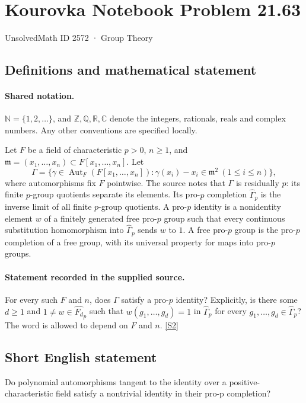 \documentclass[11pt]{article}
\newcommand{\sref}[2]{\hyperlink{source:#1:#2}{[S#2]}}
\begin{document}
\setcounter{section}{2571}
\section{Kourovka Notebook Problem 21.63}\label{2572}
{\small\sffamily UnsolvedMath ID 2572 · Group Theory}
\subsection{Definitions and mathematical statement}

\paragraph{Shared notation.}$\mathbb N=\{1,2,\ldots\}$, and $\mathbb Z,\mathbb Q,\mathbb R,\mathbb C$ denote the integers, rationals, reals and complex numbers. Any other conventions are specified locally.


Let $F$ be a field of characteristic $p>0$, $n\geq1$, and $\mathfrak m=(x_1,\ldots,x_n)\subset F[x_1,\ldots,x_n]$. Let
\[
 \Gamma=\{\gamma\in\operatorname{Aut}_F(F[x_1,\ldots,x_n]):\gamma(x_i)-x_i\in\mathfrak m^2\ (1\leq i\leq n)\},
\]
where automorphisms fix $F$ pointwise. The source notes that $\Gamma$ is residually $p$: its finite $p$-group quotients separate its elements. Its pro-$p$ completion $\widehat\Gamma_p$ is the inverse limit of all finite $p$-group quotients. A pro-$p$ identity is a nonidentity element $w$ of a finitely generated free pro-$p$ group such that every continuous substitution homomorphism into $\widehat\Gamma_p$ sends $w$ to $1$. A free pro-$p$ group is the pro-$p$ completion of a free group, with its universal property for maps into pro-$p$ groups.
\paragraph{Statement recorded in the supplied source.}
For every such $F$ and $n$, does $\Gamma$ satisfy a pro-$p$ identity? Explicitly, is there some $d\geq1$ and $1\ne w\in\widehat{F_d}_p$ such that $w(g_1,\ldots,g_d)=1$ in $\widehat\Gamma_p$ for every $g_1,\ldots,g_d\in\widehat\Gamma_p$? The word is allowed to depend on $F$ and $n$. \sref{2572}{2}
\subsection{Short English statement}
Do polynomial automorphisms tangent to the identity over a positive-characteristic field satisfy a nontrivial identity in their pro-p completion?
\end{document}
